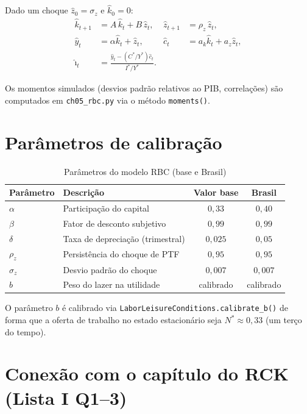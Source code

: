 \documentclass[11pt,a4paper]{article}
\newcommand{\hk}{\hat{k}}
\newcommand{\hz}{\hat{z}}
\newcommand{\hc}{\hat{c}}
\newcommand{\hy}{\hat{y}}
\newcommand{\hi}{\hat{\imath}}
\begin{document}
Dado um choque $\hz_0 = \sigma_z$ e $\hk_0 = 0$:
\begin{align}
  \hk_{t+1} &= A\,\hk_t + B\,\hz_t, &
  \hz_{t+1} &= \rho_z\,\hz_t, \\
  \hy_t &= \alpha\hk_t + \hz_t, &
  \hc_t &= a_k\hk_t + a_z\hz_t, \\
  \hi_t &= \frac{\hy_t - (C^*/Y^*)\hc_t}{I^*/Y^*}. &&
\end{align}

\noindent Os momentos simulados (desvios padrão relativos ao PIB, correlações)
são computados em \texttt{ch05\_rbc.py} via o método \texttt{moments()}.

\section{Parâmetros de calibração}

\begin{table}[h!]
  \centering
  \caption{Parâmetros do modelo RBC (base e Brasil)}
  \begin{tabular}{llcc}
    \toprule
    Parâmetro & Descrição & Valor base & Brasil \\
    \midrule
    $\alpha$ & Participação do capital & $0{,}33$ & $0{,}40$ \\
    $\beta$  & Fator de desconto subjetivo & $0{,}99$ & $0{,}99$ \\
    $\delta$ & Taxa de depreciação (trimestral) & $0{,}025$ & $0{,}05$ \\
    $\rho_z$ & Persistência do choque de PTF & $0{,}95$ & $0{,}95$ \\
    $\sigma_z$ & Desvio padrão do choque & $0{,}007$ & $0{,}007$ \\
    $b$      & Peso do lazer na utilidade & calibrado & calibrado \\
    \bottomrule
  \end{tabular}
\end{table}

\noindent O parâmetro $b$ é calibrado via \texttt{LaborLeisureConditions.calibrate\_b()}
de forma que a oferta de trabalho no estado estacionário seja $N^* \approx 0{,}33$
(um terço do tempo).

\section{Conexão com o capítulo do RCK (Lista I Q1--3)}
\end{document}
